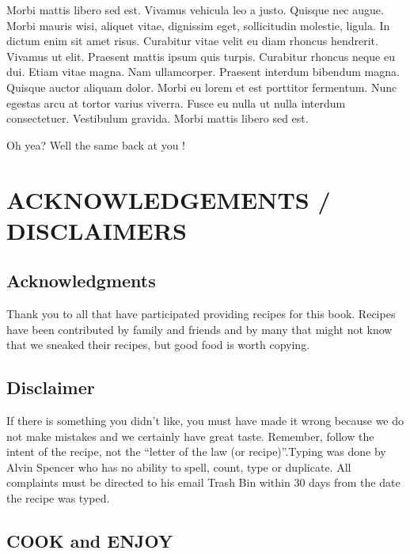 \documentclass[
]{book}
\begin{document}
Morbi mattis libero sed est. Vivamus vehicula leo a justo. Quisque nec augue. Morbi mauris wisi, aliquet vitae, dignissim eget, sollicitudin molestie, ligula. In dictum enim sit amet risus. Curabitur vitae velit eu diam rhoncus hendrerit. Vivamus ut elit. Praesent mattis ipsum quis turpis. Curabitur rhoncus neque eu dui. Etiam vitae magna. Nam ullamcorper. Praesent interdum bibendum magna. Quisque auctor aliquam dolor. Morbi eu lorem et est porttitor fermentum. Nunc egestas arcu at tortor varius viverra. Fusce eu nulla ut nulla interdum consectetuer. Vestibulum gravida. Morbi mattis libero sed est.

Oh yea? Well the same back at you !

\hypertarget{acknowledgements-disclaimers}{%
\chapter*{ACKNOWLEDGEMENTS / DISCLAIMERS}\label{acknowledgements-disclaimers}}


\hypertarget{acknowledgments}{%
\section*{Acknowledgments}\label{acknowledgments}}


Thank you to all that have participated providing recipes for this book. Recipes have been
contributed by family and friends and by many that might not know that we sneaked their recipes,
but good food is worth copying.

\hypertarget{disclaimer}{%
\section*{Disclaimer}\label{disclaimer}}


If there is something you didn't like, you must have made it wrong because we do not make mistakes and
we certainly have great taste. Remember, follow the intent of the recipe, not the ``letter of the law
(or recipe)''.Typing was done by Alvin Spencer who has no ability to spell, count, type or duplicate.
All complaints must be directed to his email Trash Bin within 30 days from the date the recipe was typed.

\hypertarget{cook-and-enjoy}{%
\section*{COOK and ENJOY}\label{cook-and-enjoy}}
\end{document}
